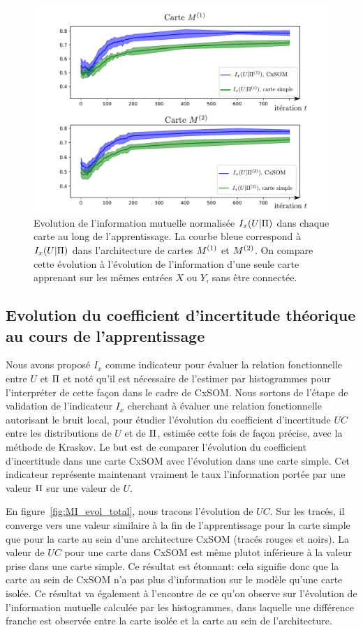 \begin{figure}
\includegraphics[width=\textwidth]{evolution_MI_binning}
\caption{Evolution de l'information mutuelle normalisée $I_x(U|\Pi)$ dans chaque carte au long de l'apprentissage. La courbe bleue correspond à $I_x(U|\Pi)$ dans l'architecture de cartes $M^{({1})}$ et $M^{({2})}$. On compare cette évolution à l'évolution de l'information d'une seule carte apprenant sur les mêmes entrées $X$ ou $Y$, sans être connectée.}
\label{fig:MI_evol}
\end{figure}

\subsection{Evolution du coefficient d'incertitude théorique au cours de l'apprentissage}

Nous avons proposé $I_x$ comme indicateur pour évaluer la relation fonctionnelle entre $U$ et $\Pi$ et noté qu'il est nécessaire de l'estimer par histogrammes pour l'interpréter de cette façon dans le cadre de CxSOM.
Nous sortons de l'étape de validation de l'indicateur $I_x$ cherchant à évaluer une relation fonctionnelle autorisant le bruit local, pour étudier l'évolution du coefficient d'incertitude $UC$ entre les distributions de $U$ et de $\Pi$, estimée cette fois de façon précise, avec la méthode de Kraskov.
Le but est de comparer l'évolution du coefficient d'incertitude dans une carte CxSOM avec l'évolution dans une carte simple. Cet indicateur représente maintenant vraiment le taux l'information portée par une valeur $\Pi$ sur une valeur de $U$.

En figure~\ref{fig:MI_evol_total}, nous tracons l'évolution de $UC$.
Sur les tracés, il converge vers une valeur similaire à la fin de l'apprentissage pour la carte simple que pour la carte au sein d'une architecture CxSOM (tracés rouges et noirs). La valeur de $UC$ pour une carte dans CxSOM est même plutot inférieure à la valeur prise dans une carte simple.
Ce résultat est étonnant: cela signifie donc que la carte au sein de CxSOM n'a pas plus d'information sur le modèle qu'une carte isolée. Ce résultat va également à l'encontre de ce qu'on observe sur l'évolution de l'information mutuelle calculée par les histogrammes, dans laquelle une différence franche est observée entre la carte isolée et la carte au sein de l'architecture.

